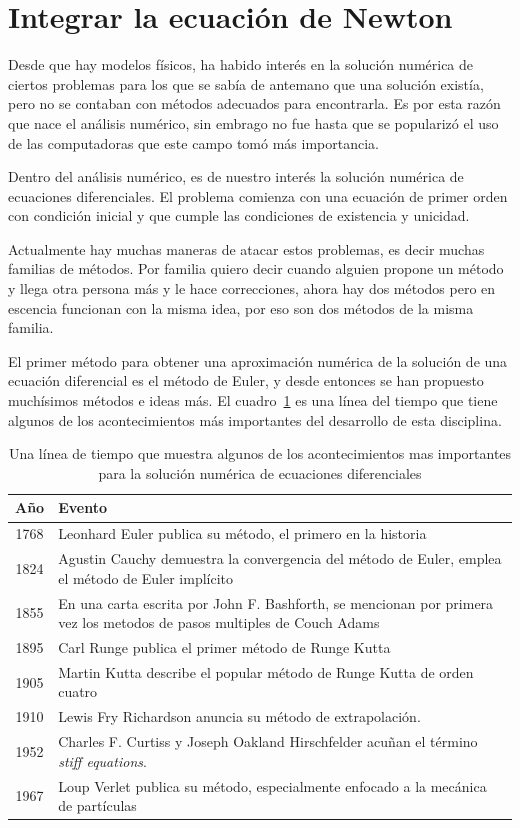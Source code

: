 \section{Integrar la ecuación de Newton}
Desde que hay modelos físicos, ha habido interés en la solución numérica de ciertos problemas para los que se sabía de antemano que una solución existía, pero no se contaban con métodos adecuados para encontrarla. Es por esta razón que nace el análisis numérico, sin embrago no fue hasta que se popularizó el uso de las computadoras que este campo tomó más importancia.

Dentro del análisis numérico, es de nuestro interés la solución numérica de ecuaciones diferenciales. El problema comienza con una ecuación de primer orden con condición inicial y que cumple las condiciones de existencia y unicidad.

Actualmente hay muchas maneras de atacar estos problemas, es decir muchas familias de métodos. Por familia quiero decir cuando alguien propone un método y llega otra persona más y le hace correcciones, ahora hay dos métodos pero en escencia funcionan con la misma idea, por eso son dos métodos de la misma familia.

El primer método para obtener una aproximación numérica de la solución de una ecuación diferencial es el método de Euler, y desde entonces se han propuesto muchísimos métodos e ideas más. El cuadro~\ref{historia:metodos} es una línea del tiempo que tiene algunos de los acontecimientos más importantes del desarrollo de esta disciplina.

\begin{table}
\caption[Evolución histórica de los métodos numéricos]{Una línea de tiempo que muestra algunos de los acontecimientos mas importantes para la solución numérica de ecuaciones diferenciales}
\label{historia:metodos}
\begin{center}
\begin{tabular} {|c|p{12cm}|} \hline
Año & Evento \\ \hline
1768 & Leonhard Euler publica su método, el primero en la historia \\
1824 & Agustin Cauchy demuestra la convergencia del método de Euler, emplea el método de Euler implícito \\
1855 & En una carta escrita por John F. Bashforth, se mencionan por primera vez los metodos de pasos multiples de Couch Adams \\
1895 & Carl Runge publica el primer método de Runge Kutta \\ 
1905 & Martin Kutta describe el popular método de Runge Kutta de orden cuatro \\ 
1910 & Lewis Fry Richardson anuncia su método de extrapolación. \\
1952 & Charles F. Curtiss y Joseph Oakland Hirschfelder acuñan el término \emph{\foreignlanguage{english}{stiff equations}}. \\
1967 & Loup Verlet publica su método, especialmente enfocado a la mecánica de partículas \\ \hline
\end{tabular}
\end{center}
\end{table}

